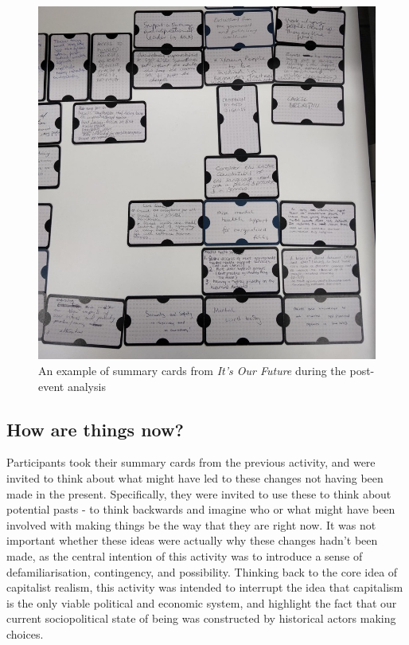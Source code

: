 \begin{figure}[hbt!]
    \centering
    \includegraphics[width=1\linewidth]{Images/7/summary-cards.jpeg}

    \caption{An example of summary cards from \textit{It's Our Future} during the post-event analysis}
    \label{fig:summary-cards}
\end{figure}
\subsection{How are things now?}
Participants took their summary cards from the previous activity, and were invited to think about what might have led to these changes not having been made in the present. Specifically, they were invited to use these to think about potential pasts - to think backwards and imagine who or what might have been involved with making things be the way that they are right now. It was not important whether these ideas were actually why these changes hadn't been made, as the central intention of this activity was to introduce a sense of defamiliarisation, contingency, and possibility. Thinking back to the core idea of capitalist realism, this activity was intended to interrupt the idea that capitalism is the only viable political and economic system, and highlight the fact that our current sociopolitical state of being was constructed by historical actors making choices.

